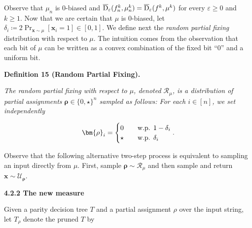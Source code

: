 \documentclass[10pt,a4paper]{article}
\begin{document}
Observe that $\mu_{n}$ is $0$-biased and $\overline{{\textup{D}}}_{\varepsilon}(f_{n}^{k},\mu_{n}^{k})=\overline{{\textup{D}}}_{\varepsilon}(f^{k},\mu^{k})$ for every $\varepsilon\geq 0$ and $k\geq 1$. Now that we are certain that $\mu$ is $0$-biased, let $\delta_{i}\coloneqq 2\Pr_{\bm{x}\sim\mu}[\bm{x}_{i}=1]\in[0,1]$. We define next the \emph{random partial fixing} distribution with respect to $\mu$. The intuition comes from the observation that each bit of $\mu$ can be written as a convex combination of the fixed bit “$0$” and a uniform bit.\par





\par\medskip\noindent\textbf{
\textbf{Definition 15}\textbf{ }(Random Partial Fixing)\textbf{.}
}\par



\emph{The random partial fixing with respect to $\mu$, denoted $\mathcal{R}_{\mu}$, is a distribution of partial assignments $\bm{\rho}\in\{0,\star\}^{n}$ sampled as follows: For each $i\in[n]$, we set independently}\par


\[\begin{gathered}
\bm{\rho}_{i}=\begin{cases}0&\quad\textup{w.p. $1-\delta_{i}$}\\
\star&\quad\textup{w.p. $\delta_{i}$}\end{cases}.
\end{gathered}\]






Observe that the following alternative two-step process is equivalent to sampling an input directly from $\mu$. First, sample $\bm{\rho}\sim\mathcal{R}_{\mu}$ and then sample and return $\bm{x}\sim\mathcal{U}_{\bm{\rho}}$.\par





\par\medskip\noindent\textbf{
4.2.2 The new measure}\par




Given a parity decision tree $T$ and a partial assignment $\rho$ over the input string, let $T_{\rho}$ denote the pruned $T$ by\par
\end{document}
